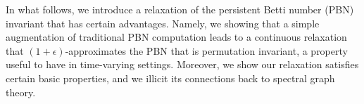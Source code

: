 \documentclass[10pt]{article}
\begin{document}
In what follows, we introduce a relaxation of the persistent Betti number (PBN) invariant that has certain advantages. Namely, we showing that a simple augmentation of traditional PBN computation leads to a continuous relaxation that $(1+\epsilon)$-approximates the PBN that is permutation invariant, a property useful to have in time-varying settings. Moreover, we show our relaxation satisfies certain basic properties, and we illicit its connections back to spectral graph theory. 








\end{document}
